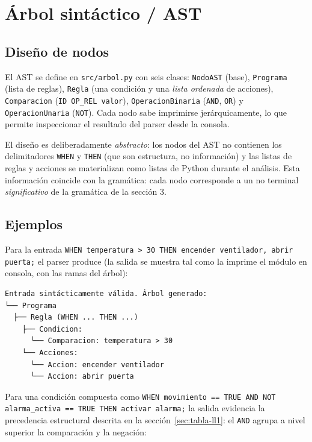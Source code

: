 \documentclass[12pt,a4paper]{article}
\begin{document}
\section{Árbol sintáctico / AST}
\label{sec:ast}

\subsection{Diseño de nodos}
El AST se define en \texttt{src/arbol.py} con seis clases: \texttt{NodoAST}
(base), \texttt{Programa} (lista de reglas), \texttt{Regla} (una condición y
una \emph{lista ordenada} de acciones), \texttt{Comparacion}
(\texttt{ID OP\_REL valor}), \texttt{OperacionBinaria} (\texttt{AND},
\texttt{OR}) y \texttt{OperacionUnaria} (\texttt{NOT}). Cada nodo sabe
imprimirse jerárquicamente, lo que permite inspeccionar el resultado del
parser desde la consola.

El diseño es deliberadamente \emph{abstracto}: los nodos del AST no contienen
los delimitadores \texttt{WHEN} y \texttt{THEN} (que son estructura, no
información) y las listas de reglas y acciones se materializan como listas de
Python durante el análisis. Esta información coincide con la gramática: cada
nodo corresponde a un no terminal \emph{significativo} de la gramática de la
sección 3.

\subsection{Ejemplos}
Para la entrada \texttt{WHEN temperatura > 30 THEN encender ventilador, abrir
puerta;} el parser produce (la salida se muestra tal como la imprime el
módulo en consola, con las ramas del árbol):

\begin{lstlisting}
Entrada sintácticamente válida. Árbol generado:
└── Programa
  ├── Regla (WHEN ... THEN ...)
    ├── Condicion:
      └── Comparacion: temperatura > 30
    └── Acciones:
      └── Accion: encender ventilador
      └── Accion: abrir puerta
\end{lstlisting}

Para una condición compuesta como \texttt{WHEN movimiento == TRUE AND NOT
alarma\_activa == TRUE THEN activar alarma;} la salida evidencia la
precedencia estructural descrita en la sección~\ref{sec:tabla-ll1}: el
\texttt{AND} agrupa a nivel superior la comparación y la negación:
\end{document}
